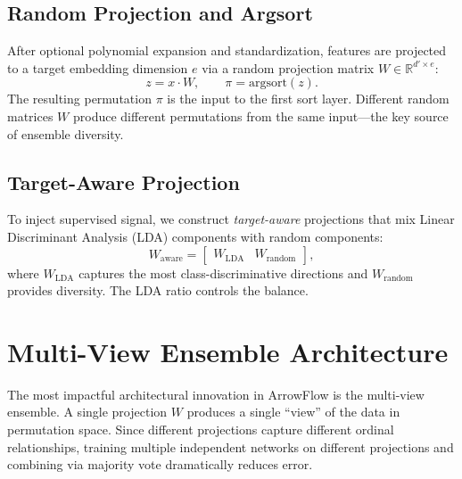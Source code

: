 \documentclass[12pt]{article}
\newcommand{\R}{\mathbb{R}}
\newcommand{\argsort}{\mathrm{argsort}}
\begin{document}
\subsection{Random Projection and Argsort}
After optional polynomial expansion and standardization, features are projected to a target embedding dimension $e$ via a random projection matrix $W \in \R^{d' \times e}$:
\begin{equation}
z = x \cdot W, \qquad \pi = \argsort(z).
\end{equation}
The resulting permutation $\pi$ is the input to the first sort layer. Different random matrices $W$ produce different permutations from the same input---the key source of ensemble diversity.

\subsection{Target-Aware Projection}
To inject supervised signal, we construct \emph{target-aware} projections that mix Linear Discriminant Analysis (LDA) components with random components:
\begin{equation}
W_{\mathrm{aware}} = \begin{bmatrix} W_{\mathrm{LDA}} & W_{\mathrm{random}} \end{bmatrix},
\end{equation}
where $W_{\mathrm{LDA}}$ captures the most class-discriminative directions and $W_{\mathrm{random}}$ provides diversity. The LDA ratio controls the balance.


\section{Multi-View Ensemble Architecture}
\label{sec:ensemble}

The most impactful architectural innovation in ArrowFlow is the multi-view ensemble. A single projection $W$ produces a single ``view'' of the data in permutation space. Since different projections capture different ordinal relationships, training multiple independent networks on different projections and combining via majority vote dramatically reduces error.
\end{document}
